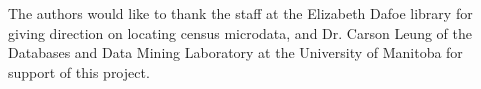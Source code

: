 \documentclass[10pt, conference, compsocconf]{IEEEtran}
\begin{document}
The authors would like to thank the staff at the Elizabeth Dafoe library for giving direction on locating census microdata, and Dr. Carson Leung of the Databases and Data Mining Laboratory at the University of Manitoba for support of this project.




%
%
%






\end{document}
